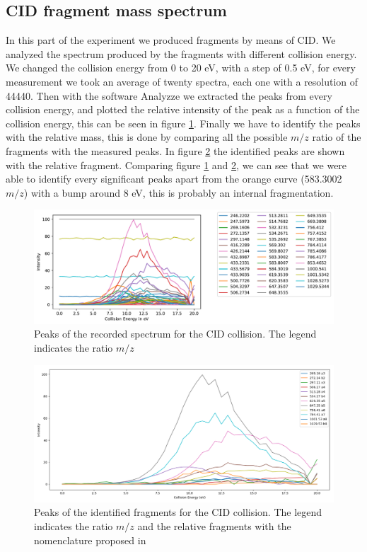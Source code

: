 \documentclass[a4paper,10pt]{article}
\begin{document}
\subsection{CID fragment mass spectrum}
In this part of the experiment we produced fragments by means of CID. We analyzed the spectrum produced by the fragments with different collision energy. %
We changed the collision energy from 0 to 20 eV, with a step of 0.5 eV, for every measurement we took an average of twenty spectra, each one with a resolution of 44440. Then with the software Analyzze we extracted the peaks from every collision energy, and plotted the relative intensity of the peak as a function of the collision energy, this can be seen in figure \ref{cidcollision}.
Finally we have to identify the peaks with the relative mass, this is done by comparing all the possible $m/z$ ratio of the fragments with the measured peaks. In figure \ref{cidcollisionidentified} the identified peaks are shown with the relative fragment. Comparing figure \ref{cidcollision} and \ref{cidcollisionidentified}, we can see that we were able to identify every significant peaks apart from the orange curve (583.3002 $m/z$) with a bump around 8 eV, this is probably an internal fragmentation.
\begin{figure}[H]
	\centering
	\includegraphics[width = \textwidth]{cid_collision}
	\caption{Peaks of the recorded spectrum for the CID collision. The legend indicates the ratio $m/z$}
	\label{cidcollision}
\end{figure}
\begin{figure}[H]
	\centering
	\includegraphics[width = \textwidth]{identifiedcid}
	\caption{Peaks of the identified fragments for the CID collision. The legend indicates the ratio $m/z$ and the relative fragments with the nomenclature proposed in \cite{fragmentsnomenclature}}
	\label{cidcollisionidentified}
\end{figure}
\end{document}
